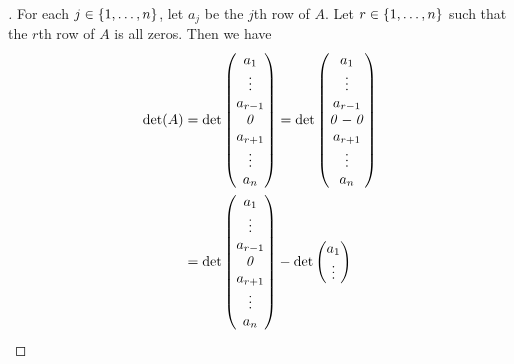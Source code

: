 \begin{proof}[]
  For each \(j \in \left\lbrace1, \dots, n\right\rbrace\), let \(a_j\) be the \(j\)th row of \(A\).
  Let \(r \in \left\lbrace1, \dots, n\right\rbrace\) such that the \(r\)th row of \(A\) is all zeros.
  Then we have
  \begin{align*}
    \det(A) & = \det\begin{pmatrix}
                      a_1       \\
                      \vdots    \\
                      a_{r - 1} \\
                      \mathit{0}       \\
                      a_{r + 1} \\
                      \vdots    \\
                      a_n
                    \end{pmatrix} = \det\begin{pmatrix}
                                          a_1       \\
                                          \vdots    \\
                                          a_{r - 1} \\
                                          \mathit{0} - \mathit{0} \\
                                          a_{r + 1} \\
                                          \vdots    \\
                                          a_n
                                        \end{pmatrix}              \\
            & = \det\begin{pmatrix}
                      a_1       \\
                      \vdots    \\
                      a_{r - 1} \\
                      \mathit{0}       \\
                      a_{r + 1} \\
                      \vdots    \\
                      a_n
                    \end{pmatrix} - \det\begin{pmatrix}
                                          a_1       \\
                                          \vdots    \\

\end{pmatrix}
\end{align*}
\end{proof}

